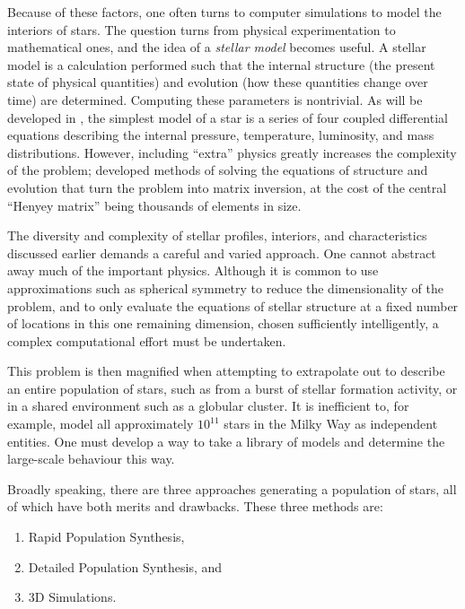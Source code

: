 Because of these factors, one often turns to computer simulations to model the interiors of stars. The question turns from physical experimentation to mathematical ones, and the idea of a \textit{stellar model} becomes useful. A stellar model is a calculation performed such that the internal structure (the present state of physical quantities) and evolution (how these quantities change over time) are determined. Computing these parameters is nontrivial. As will be developed in , the simplest model of a star is a series of four coupled differential equations describing the internal pressure, temperature, luminosity, and mass distributions. However, including ``extra'' physics greatly increases the complexity of the problem; \citet{Henyey:1964} developed methods of solving the equations of structure and evolution that turn the problem into matrix inversion, at the cost of the central ``Henyey matrix'' being thousands of elements in size.

The diversity and complexity of stellar profiles, interiors, and characteristics discussed earlier demands a careful and varied approach. One cannot abstract away much of the important physics. Although it is common to use approximations such as spherical symmetry to reduce the dimensionality of the problem, and to only evaluate the equations of stellar structure at a fixed number of locations in this one remaining dimension, chosen sufficiently intelligently, a complex computational effort must be undertaken.

This problem is then magnified when attempting to extrapolate out to describe an entire population of stars, such as from a burst of stellar formation activity, or in a shared environment such as a globular cluster. It is inefficient to, for example, model all approximately $10^{11}$ stars in the Milky Way \citep{Marov:2015} as independent entities. One must develop a way to take a library of models and determine the large-scale behaviour this way.

Broadly speaking, there are three approaches generating a population of stars, all of which have both merits and drawbacks. These three methods are:

\begin{enumerate}
    \item Rapid Population Synthesis,
    \item Detailed Population Synthesis, and
    \item 3D Simulations.
\end{enumerate}

